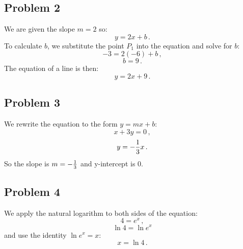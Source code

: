\documentclass[10pt]{article}
\begin{document}
\subsection*{Problem 2}

We are given the slope $m=2$ so:
$$y=2x+b\,.$$
To calculate $b$, we substitute the point $P_1$ into the equation and solve for
$b$:
$$-3=2(-6)+b\,,$$
$$b=9\,.$$
The equation of a line is then:
$$y = 2x+9\,.$$

\subsection*{Problem 3}

We rewrite the equation to the form $y=mx+b$:
$$x+3y=0\,,$$
$$y=-{1\over3}x\,.$$
So the slope is $m=-{1\over3}$ and y-intercept is $0$.

\subsection*{Problem 4}

We apply the natural logarithm to both sides of the equation:
$$4=e^x\,,$$
$$\ln 4=\ln e^x$$
and use the identity $\ln e^x = x$:
$$x=\ln 4\,.$$
\end{document}
